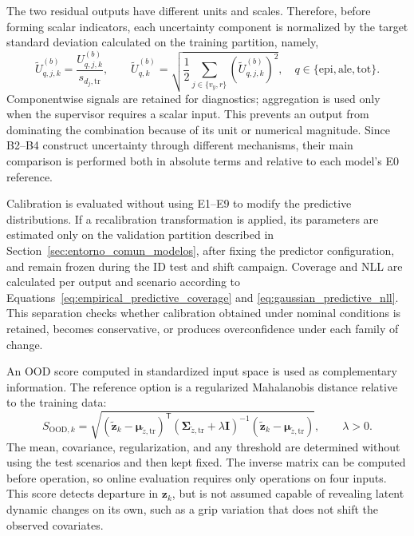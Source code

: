 \documentclass[12pt,a4paper]{report}
\begin{document}
The two residual outputs have different units and scales. Therefore, before forming scalar indicators, each uncertainty component is normalized by the target standard deviation calculated on the training partition, namely,
\begin{equation}
    \widetilde U^{(b)}_{q,j,k}
    =
    \frac{U^{(b)}_{q,j,k}}{s_{d_j,\mathrm{tr}}},
    \qquad
    \widetilde U^{(b)}_{q,k}
    =
    \sqrt{
        \frac{1}{2}
        \sum_{j\in\{v_y,r\}}
        \left(\widetilde U^{(b)}_{q,j,k}\right)^2
    },
    \quad
    q\in\{\mathrm{epi},\mathrm{ale},\mathrm{tot}\}.
    \label{eq:dimensionless_uncertainty_aggregation}
\end{equation}
Componentwise signals are retained for diagnostics; aggregation is used only when the supervisor requires a scalar input. This prevents an output from dominating the combination because of its unit or numerical magnitude. Since B2--B4 construct uncertainty through different mechanisms, their main comparison is performed both in absolute terms and relative to each model's E0 reference.

Calibration is evaluated without using E1--E9 to modify the predictive distributions. If a recalibration transformation is applied, its parameters are estimated only on the validation partition described in Section~\ref{sec:entorno_comun_modelos}, after fixing the predictor configuration, and remain frozen during the ID test and shift campaign. Coverage and NLL are calculated per output and scenario according to Equations~\eqref{eq:empirical_predictive_coverage} and \eqref{eq:gaussian_predictive_nll}. This separation checks whether calibration obtained under nominal conditions is retained, becomes conservative, or produces overconfidence under each family of change.

An OOD score computed in standardized input space is used as complementary information. The reference option is a regularized Mahalanobis distance relative to the training data:
\begin{equation}
    S_{\mathrm{OOD},k}
    =
    \sqrt{
        \left(\widetilde{\mathbf z}_k-
              \boldsymbol{\mu}_{\widetilde z,\mathrm{tr}}\right)^{\mathsf T}
        \left(\boldsymbol{\Sigma}_{\widetilde z,\mathrm{tr}}
              +\lambda\mathbf I\right)^{-1}
        \left(\widetilde{\mathbf z}_k-
              \boldsymbol{\mu}_{\widetilde z,\mathrm{tr}}\right)
    },
    \qquad \lambda>0.
    \label{eq:mahalanobis_ood_score}
\end{equation}
The mean, covariance, regularization, and any threshold are determined without using the test scenarios and then kept fixed. The inverse matrix can be computed before operation, so online evaluation requires only operations on four inputs. This score detects departure in $\mathbf z_k$, but is not assumed capable of revealing latent dynamic changes on its own, such as a grip variation that does not shift the observed covariates.
\end{document}
